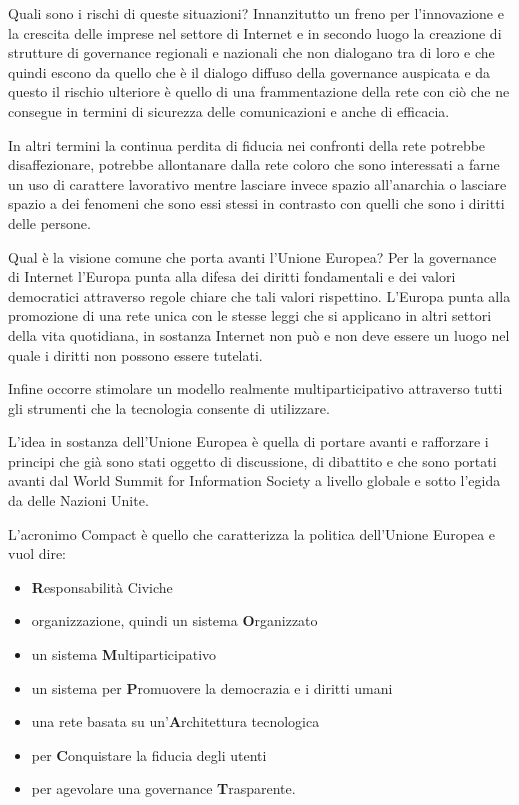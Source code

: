  Quali sono i rischi di queste situazioni? Innanzitutto un freno per l'innovazione e la crescita delle imprese nel settore di Internet e in secondo luogo la creazione di strutture di governance regionali e nazionali che non dialogano tra di loro e che quindi escono da quello che è il dialogo diffuso della governance auspicata e da questo il rischio ulteriore è quello di una frammentazione della rete con ciò che ne consegue in termini di sicurezza delle comunicazioni e anche di efficacia.\par
 In altri termini la continua perdita di fiducia nei confronti della rete potrebbe disaffezionare, potrebbe allontanare dalla rete coloro che sono interessati a farne un uso di carattere lavorativo mentre lasciare invece spazio all'anarchia o lasciare spazio a dei fenomeni che sono essi stessi in contrasto con quelli che sono i diritti delle persone.\par 
 Qual è la visione comune che porta avanti l'Unione Europea? Per la governance di Internet l'Europa punta alla difesa dei diritti fondamentali e dei valori democratici attraverso regole chiare che tali valori rispettino. L'Europa punta alla promozione di una rete unica con le stesse leggi che si applicano in altri settori della vita quotidiana, in sostanza Internet non può e non deve essere un luogo nel quale i diritti non possono essere tutelati.\par
 Infine occorre stimolare un modello realmente multiparticipativo attraverso tutti gli strumenti che la tecnologia consente di utilizzare.\par 
 L'idea in sostanza dell'Unione Europea è quella di portare avanti e rafforzare i principi che già sono stati oggetto di discussione, di dibattito e che sono portati avanti dal World Summit for Information Society a livello globale e sotto l'egida da delle Nazioni Unite. \par
 L'acronimo Compact è quello che caratterizza la politica dell'Unione Europea e vuol dire:
 \begin{itemize}
     \item \textbf{R}esponsabilità Civiche 
     \item organizzazione, quindi un sistema \textbf{O}rganizzato
     \item un sistema \textbf{M}ultiparticipativo
     \item un sistema per \textbf{P}romuovere la democrazia e i diritti umani
     \item una rete basata su un'\textbf{A}rchitettura tecnologica
     \item per \textbf{C}onquistare la fiducia degli utenti
     \item per agevolare una governance \textbf{T}rasparente.
 \end{itemize}
